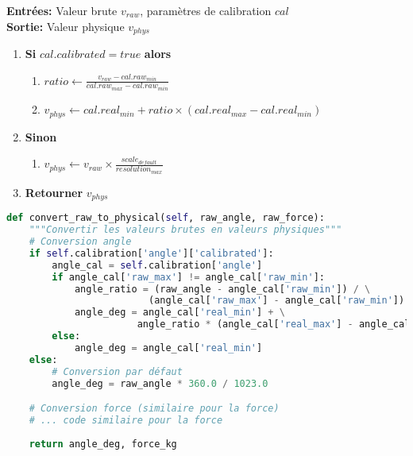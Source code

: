 \documentclass[12pt,a4paper]{article}
\begin{document}
\begin{tcolorbox}[title=Algorithme: Conversion des valeurs brutes en valeurs physiques]
\textbf{Entrées:} Valeur brute $v_{raw}$, paramètres de calibration $cal$\\
\textbf{Sortie:} Valeur physique $v_{phys}$

\begin{enumerate}
    \item \textbf{Si} $cal.calibrated = true$ \textbf{alors}
    \begin{enumerate}
        \item $ratio \leftarrow \frac{v_{raw} - cal.raw_{min}}{cal.raw_{max} - cal.raw_{min}}$
        \item $v_{phys} \leftarrow cal.real_{min} + ratio \times (cal.real_{max} - cal.real_{min})$
    \end{enumerate}
    \item \textbf{Sinon}
    \begin{enumerate}
        \item $v_{phys} \leftarrow v_{raw} \times \frac{scale_{default}}{resolution_{max}}$
    \end{enumerate}
    \item \textbf{Retourner} $v_{phys}$
\end{enumerate}
\end{tcolorbox}

\begin{lstlisting}[language=python, caption=Implémentation de la conversion]
def convert_raw_to_physical(self, raw_angle, raw_force):
    """Convertir les valeurs brutes en valeurs physiques"""
    # Conversion angle
    if self.calibration['angle']['calibrated']:
        angle_cal = self.calibration['angle']
        if angle_cal['raw_max'] != angle_cal['raw_min']:
            angle_ratio = (raw_angle - angle_cal['raw_min']) / \
                         (angle_cal['raw_max'] - angle_cal['raw_min'])
            angle_deg = angle_cal['real_min'] + \
                       angle_ratio * (angle_cal['real_max'] - angle_cal['real_min'])
        else:
            angle_deg = angle_cal['real_min']
    else:
        # Conversion par défaut
        angle_deg = raw_angle * 360.0 / 1023.0

    # Conversion force (similaire pour la force)
    # ... code similaire pour la force
    
    return angle_deg, force_kg
\end{lstlisting}

\end{document}
